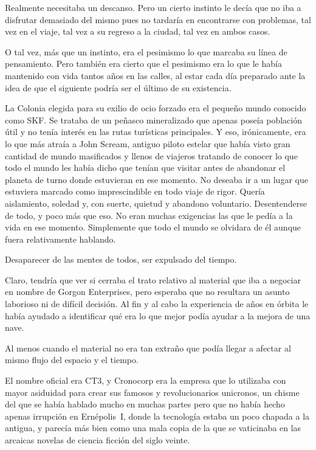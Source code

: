 Realmente necesitaba un descanso. Pero un cierto instinto le decía que no iba a disfrutar demasiado del mismo pues no tardaría en encontrarse con problemas, tal vez en el viaje, tal vez a su regreso a la ciudad, tal vez en ambos casos.

O tal vez, más que un instinto, era el pesimismo lo que marcaba su línea de pensamiento. Pero también era cierto que el pesimismo era lo que le había mantenido con vida tantos años en las calles, al estar cada día preparado ante la idea de que el siguiente podría ser el último de su existencia.

La Colonia elegida para su exilio de ocio forzado era el pequeño mundo conocido como SKF. Se trataba de un peñasco mineralizado que apenas poseía población útil y no tenía interés en las rutas turísticas principales. Y eso, irónicamente, era lo que más atraía a John Scream, antiguo piloto estelar que había visto gran cantidad de mundo masificados y llenos de viajeros tratando de conocer lo que todo el mundo les había dicho que tenían que visitar antes de abandonar el planeta de turno donde estuvieran en ese momento. No deseaba ir a un lugar que estuviera marcado como imprescindible en todo viaje de rigor. Quería aislamiento, soledad y, con suerte, quietud y abandono voluntario. Desentenderse de todo, y poco más que eso. No eran muchas exigencias las que le pedía a la vida en ese momento. Simplemente que todo el mundo se olvidara de él aunque fuera relativamente hablando.

Desaparecer de las mentes de todos, ser expulsado del tiempo.

Claro, tendría que ver si cerraba el trato relativo al material que iba a negociar en nombre de Gorgon Enterprises, pero esperaba que no resultara un asunto laborioso ni de difícil decisión. Al fin y al cabo la experiencia de años en órbita le había ayudado a identificar qué era lo que mejor podía ayudar a la mejora de una nave.

Al menos cuando el material no era tan extraño que podía llegar a afectar al mismo flujo del espacio y el tiempo.

El nombre oficial era CT3, y Cronocorp era la empresa que lo utilizaba con mayor asiduidad para crear sus famosos y revolucionarios unicronos, un chisme del que se había hablado mucho en muchas partes pero que no había hecho apenas irrupción en Ernépolis~I, donde la tecnología estaba un poco chapada a la antigua, y parecía más bien como una mala copia de la que se vaticinaba en las arcaicas novelas de ciencia ficción del siglo veinte.

